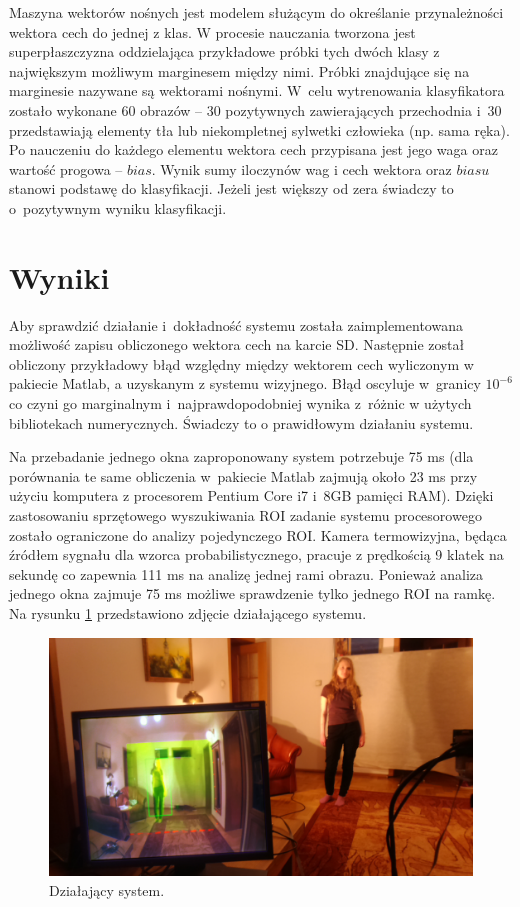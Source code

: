 Maszyna wektorów nośnych jest modelem służącym do określanie przynależności wektora cech do jednej z klas. W procesie nauczania tworzona jest superpłaszczyzna oddzielająca przykładowe próbki tych dwóch klasy z największym możliwym marginesem między nimi. Próbki znajdujące się na marginesie nazywane są wektorami nośnymi. W~celu wytrenowania klasyfikatora zostało wykonane 60 obrazów -- 30 pozytywnych zawierających przechodnia i~30 przedstawiają elementy tła lub niekompletnej sylwetki człowieka (np. sama ręka). Po nauczeniu do każdego elementu wektora cech przypisana jest jego waga oraz wartość progowa -- $bias$.
Wynik sumy iloczynów wag i cech wektora oraz $biasu$ stanowi podstawę do klasyfikacji. Jeżeli jest większy od zera świadczy to o~pozytywnym wyniku klasyfikacji.


\section{Wyniki}

Aby sprawdzić działanie i~dokładność systemu została zaimplementowana możliwość zapisu obliczonego wektora cech na karcie SD.
Następnie został obliczony przykładowy błąd względny między wektorem cech wyliczonym w pakiecie Matlab, a uzyskanym z systemu wizyjnego. %
Błąd oscyluje w~granicy \(10^{-6}\) co czyni go marginalnym i~najprawdopodobniej wynika z~różnic w użytych bibliotekach numerycznych. 
Świadczy to o prawidłowym działaniu systemu.

Na przebadanie jednego okna zaproponowany system potrzebuje 75 ms (dla porównania te same obliczenia w~pakiecie Matlab zajmują około 23 ms przy użyciu komputera z procesorem Pentium Core i7 i~8GB pamięci RAM).
Dzięki zastosowaniu sprzętowego wyszukiwania ROI zadanie systemu procesorowego zostało ograniczone do analizy pojedynczego ROI. 
Kamera termowizyjna, będąca źródłem sygnału dla wzorca probabilistycznego, pracuje z prędkością 9 klatek na sekundę co zapewnia 111 ms na analizę jednej rami obrazu. 
Ponieważ analiza jednego okna zajmuje 75 ms  możliwe sprawdzenie tylko jednego ROI na ramkę. 
Na rysunku \ref{fig:workingSystem} przedstawiono zdjęcie działającego systemu.

\begin{figure}
\centering
\includegraphics[width=0.8\linewidth]{images/workingSystem.jpg}
\caption[Działający system.]{Działający system.}
\label{fig:workingSystem}
\end{figure}

